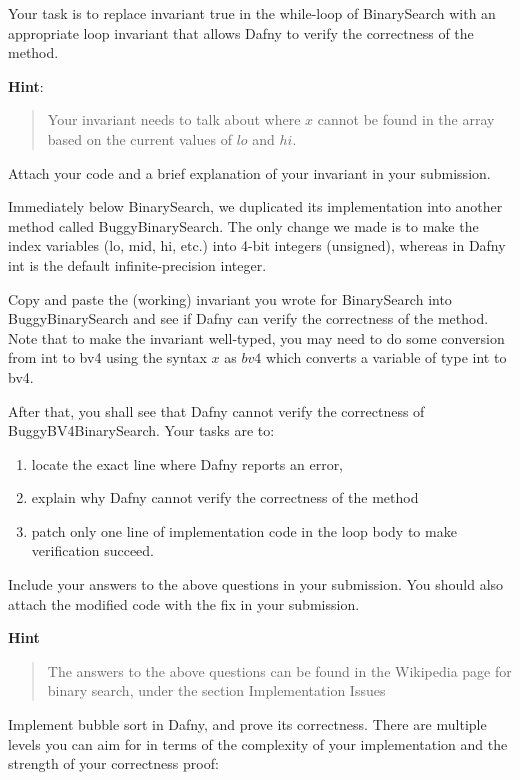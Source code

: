 \documentclass{jhwhw}
\begin{document}
Your task is to replace invariant true in the while-loop of BinarySearch with an appropriate loop invariant that allows Dafny to verify the correctness of the method.


\textbf{Hint}: 
\begin{quote} 
    Your invariant needs to talk about where $x$ cannot be found in the array based on the current values of $lo$ and $hi$. 
\end{quote}
Attach your code and a brief explanation of your invariant in your submission.

\solution

Immediately below BinarySearch, we duplicated its implementation into another method called BuggyBinarySearch. The only change we made is to make the index variables (lo, mid, hi, etc.) into 4-bit integers (unsigned), whereas in Dafny int is the default infinite-precision integer.


Copy and paste the (working) invariant you wrote for BinarySearch into BuggyBinarySearch and see if Dafny can verify the correctness of the method. Note that to make the invariant well-typed, you may need to do some conversion from int to bv4 using the syntax $x$ as $bv4$ which converts a variable of type int to bv4.


After that, you shall see that Dafny cannot verify the correctness of BuggyBV4BinarySearch. Your tasks are to:
\begin{enumerate}
    \item locate the exact line where Dafny reports an error,
    \item explain why Dafny cannot verify the correctness of the method
    \item patch only one line of implementation code in the loop body to make verification succeed.
\end{enumerate}


Include your answers to the above questions in your submission. You should also attach the modified code with the fix in your submission.

\textbf{Hint}
\begin{quote}
    The answers to the above questions can be found in the Wikipedia page for binary search, under the section Implementation Issues
\end{quote}
\solution

Implement bubble sort in Dafny, and prove its correctness. There are multiple levels you can aim for in terms of the complexity of your implementation and the strength of your correctness proof:
\end{document}
